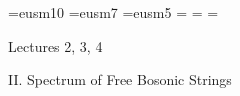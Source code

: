 \def\fbar{\bar{f}}  \def\mubar{\bar{\mu}}
\def\barh{\bar{h}}  \def\gammabar{\bar{\gamma}}
\def\kbar{\bar{k}}  \def\lambar{\bar{\lambda}}
\def\wbar{\bar{w}}  \def\Lambar{\bar{\Lambda}}
\def\zbar{\bar{z}}
\def\Abar{\bar{A}}
\def\Kbar{\bar{K}}
\def\Sbar{\bar{S}}
\def\Tbar{\bar{T}}

\def\htil{\tilde{h}}
\def\xtil{\tilde{x}}
\def\Ltil{\tilde{L}}
\def\Ntil{\widetilde{N}}
\def\Ttil{\widetilde{T}}
\def\scrFtil{\widetilde{\scrF}}
\def\epstil{\tilde{\eps}}

\def\dbR{{\Bbb R}}
\def\dbZ{{\Bbb Z}}





\def\db#1{{\fam\msbfam\relax#1}}

\def\dbA{{\db A}} \def\dbB{{\db B}}
\def\dbC{{\db C}} \def\dbD{{\db D}}
\def\dbE{{\db E}} \def\dbF{{\db F}}
\def\dbG{{\db G}} \def\dbH{{\db H}}
\def\dbI{{\db I}} \def\dbJ{{\db J}}
\def\dbK{{\db K}} \def\dbL{{\db L}}
\def\dbM{{\db M}} \def\dbN{{\db N}}
\def\dbO{{\db O}} \def\dbP{{\db P}}
\def\dbQ{{\db Q}} \def\dbR{{\db R}}
\def\dbS{{\db S}} \def\dbT{{\db T}}
\def\dbU{{\db U}} \def\dbV{{\db V}}
\def\dbW{{\db W}} \def\dbX{{\db X}}
\def\dbY{{\db Y}} \def\dbZ{{\db Z}}

\font\teneusm=eusm10  \font\seveneusm=eusm7 
\font\fiveeusm=eusm5 
\newfam\eusmfam 
\textfont\eusmfam=\teneusm 
\scriptfont\eusmfam=\seveneusm 
\scriptscriptfont\eusmfam=\fiveeufm 
\def\scr#1{{\fam\eusmfam\relax#1}}



\def\scrA{{\scr A}}   \def\scrB{{\scr B}}
\def\scrC{{\scr C}}   \def\scrD{{\scr D}}
\def\scrE{{\scr E}}   \def\scrF{{\scr F}}
\def\scrG{{\scr G}}   \def\scrH{{\scr H}}
\def\scrI{{\scr I}}   \def\scrJ{{\scr J}}
\def\scrK{{\scr K}}   \def\scrL{{\scr L}}
\def\scrM{{\scr M}}   \def\scrN{{\scr N}}
\def\scrO{{\scr O}}   \def\scrP{{\scr P}}
\def\scrQ{{\scr Q}}   \def\scrR{{\scr R}}
\def\scrS{{\scr S}}   \def\scrT{{\scr T}}
\def\scrU{{\scr U}}   \def\scrV{{\scr V}}
\def\scrW{{\scr W}}   \def\scrX{{\scr X}}
\def\scrY{{\scr Y}}   \def\scrZ{{\scr Z}}

\parindent=18pt

\bigskip\bigskip
\centerline{\boldtitlefont Lectures 2, 3, 4}
\medskip
\centerline{\smallboldtitle II. Spectrum of Free Bosonic
Strings}

